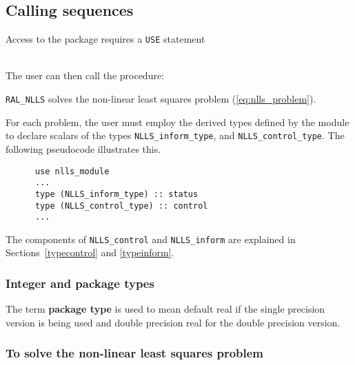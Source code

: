 \documentclass{hslspec}
\begin{document}
\newpage
\hslhowto

\subsection{Calling sequences}

Access to the package requires a {\tt USE} statement \\ \\
\indent\hspace{5mm}{\tt use nlls\_module} 
\medskip

\noindent The user can then call the procedure:
\vspace{-0.1cm}
\begin{description}
\item {\tt RAL\_NLLS}  solves the non-linear least squares problem (\ref{eq:nlls_problem}).
\end{description}


\hsltypes
\label{derived types}
For each problem, the user must employ the derived types defined by the
module to declare scalars of the types {\tt NLLS\_inform\_type}, and
{\tt NLLS\_control\_type}.
The following pseudocode illustrates this.
\begin{verbatim}
      use nlls_module
      ...
      type (NLLS_inform_type) :: status
      type (NLLS_control_type) :: control
      ...
\end{verbatim}
The components of {\tt NLLS\_control} and {\tt NLLS\_inform} are explained
in Sections~\ref{typecontrol} and \ref{typeinform}. 


\hslarguments

\subsubsection{Integer and package types}
The term {\bf package type} is used to mean
default real if the single precision version is being used and
double precision real for the double precision version.

\subsubsection{To solve the non-linear least squares problem}
\label{sec:factorize}
\end{document}
